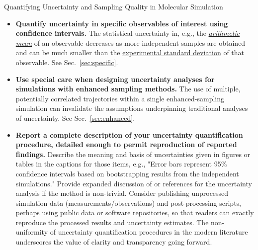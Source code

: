 \begin{Checklists*}[p!]
\begin{checklist}{Quantifying Uncertainty and Sampling Quality in Molecular Simulation}
\begin{itemize}
\item
  \textbf{Quantify uncertainty in specific observables of interest using confidence intervals.}
  The statistical uncertainty in, e.g., the \hyperref[def:arith_mean]{\emph{arithmetic mean}} of an observable decreases as more independent samples are obtained and can be much smaller than the \hyperref[def:exp_st_dev]{experimental standard deviation} of that observable.
  See Sec.\ \ref{sec:specific}.
 
\item
  \textbf{Use special care when designing uncertainty analyses for simulations with enhanced sampling methods.}
  The use of multiple, potentially correlated trajectories within a single enhanced-sampling simulation can invalidate the assumptions underpinning traditional analyses of uncertainty.
  See Sec.\ \ref{sec:enhanced}.

\item
\textbf{Report a complete description of your uncertainty quantification procedure, detailed enough to permit reproduction of reported findings.}
Describe the meaning and basis of uncertainties given in figures or tables in the captions for those items, e.g., "Error bars represent 95\% confidence intervals based on bootstrapping results from the independent simulations."
Provide expanded discussion of or references for the uncertainty analysis if the method is non-trivial.
Consider publishing unprocessed simulation data (measurements/observations) and post-processing scripts, perhaps using public data or software repositories, so that readers can exactly reproduce the processed results and uncertainty estimates. 
The non-uniformity of uncertainty quantification procedures in the modern literature underscores the value of clarity and transparency going forward.

\end{itemize}
\end{checklist}
\end{Checklists*}
